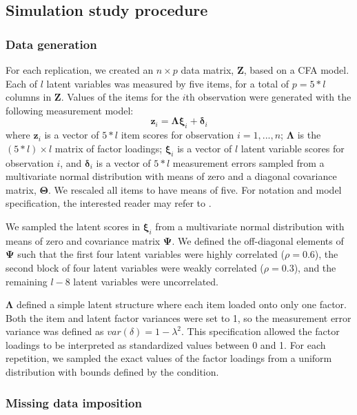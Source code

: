 \FloatBarrier %

\subsection{Simulation study procedure}

\subsubsection{Data generation}
	For each replication, we created an $n \times p$ data matrix, $\bm{Z}$, based on a CFA model.
	Each of $l$ latent variables was measured by five items, for a total of $p = 5*l$ 
	columns in $\bm{Z}$.
	Values of the items for the $i$th observation were generated with the following measurement model:
%
	\begin{equation}
		\bm{z}_i = \bm{\Lambda} \bm{\xi}_i + \bm{\delta}_i
	\end{equation}
%
	where $\bm{z}_i$ is a vector of $5*l$ item scores for observation $i = 1, ..., n$;
	$\bm{\Lambda}$ is the $(5*l) \times l$ matrix of factor loadings; $\bm{\xi}_i$ is a vector of $l$ latent variable scores 
	for observation $i$, and $\bm{\delta}_i$ is a vector of $5*l$ measurement errors sampled from a 
	multivariate normal distribution with means of zero and a diagonal covariance matrix, $\bm{\Theta}$.
	We rescaled all items to have means of five.
	For notation and model specification, the interested reader may refer to \cite{bollen:1989}.

	We sampled the latent scores in $\bm{\xi}_i$ from a multivariate normal distribution with means of zero and covariance matrix $\bm{\Psi}$. We defined the off-diagonal elements of $\bm{\Psi}$ such that the first four latent variables were highly correlated ($\rho = 0.6$), the second block of four 
	latent variables were weakly correlated ($\rho = 0.3$), and the remaining $l-8$ latent variables were uncorrelated.

	$\bm{\Lambda}$ defined a simple latent structure where each item loaded onto only one factor.
	Both the item and latent factor variances were set to 1, so the measurement error variance was defined as 
	$var(\delta) = 1 - \lambda^{2}$.
	This specification allowed the factor loadings to be
	interpreted as standardized values between 0 and 1.
	For each repetition, we sampled the exact values of the factor loadings from a uniform distribution with bounds defined by the condition.

\subsubsection{Missing data imposition}


